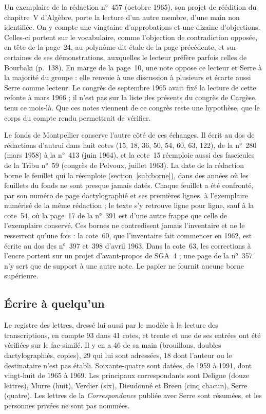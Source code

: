 \documentclass[11pt]{amsart}
\begin{document}
Un exemplaire de la rédaction n°~457 (octobre 1965), son projet de réédition du chapitre~V d'Algèbre, porte la lecture d'un autre membre, d'une main non identifiée. On y compte une vingtaine d'approbations et une dizaine d'objections. Celles-ci portent sur le vocabulaire, comme l'objection de contradiction opposée, en tête de la page~24, au polynôme dit étale de la page précédente, et sur certaines de ses démonstrations, auxquelles le lecteur préfère parfois celles de Bourbaki (p.~138). En marge de la page~10, une note oppose ce lecteur et Serre à la majorité du groupe : elle renvoie à une discussion à plusieurs et écarte aussi Serre comme lecteur. Le congrès de septembre 1965 avait fixé la lecture de cette refonte à mars 1966 ; il n'est pas sur la liste des présents du congrès de Cargèse, tenu ce mois-là. Que ces notes viennent de ce congrès reste une hypothèse, que le corps du compte rendu permettrait de vérifier.

Le fonds de Montpellier conserve l'autre côté de ces échanges. Il écrit au dos de rédactions d'autrui dans huit cotes (15, 18, 36, 50, 54, 60, 63, 122), de la n°~280 (mars 1958) à la n°~413 (juin 1964), et la cote~15 réemploie aussi des fascicules de la Tribu n°~59 (congrès de Pelvoux, juillet 1963). La date de la rédaction borne le feuillet qui la réemploie (section~\ref{sub:borne}), dans des années où les feuillets du fonds ne sont presque jamais datés. Chaque feuillet a été confronté, par son numéro de page dactylographié et ses premières lignes, à l'exemplaire numérisé de la même rédaction ; le texte s'y retrouve ligne pour ligne, sauf à la cote~54, où la page~17 de la n°~391 est d'une autre frappe que celle de l'exemplaire conservé. Ces bornes ne contredisent jamais l'inventaire et ne le resserrent qu'une fois : la cote~60, que l'inventaire fait commencer en 1962, est écrite au dos des n°~397 et~398 d'avril 1963. Dans la cote~63, les corrections à l'encre portent sur un projet d'avant-propos de SGA~4 ; une page de la n°~357 n'y sert que de support à une autre note. Le papier ne fournit aucune borne supérieure.

\subsection{Écrire à quelqu'un}

Le registre des lettres, dressé lui aussi par le modèle à la lecture des transcriptions, en compte 93 dans 41 cotes, et trente et une de ses entrées ont été vérifiées sur le fac-similé. Il y en a 46 de sa main (brouillons, doubles dactylographiés, copies), 29 qui lui sont adressées, 18 dont l'auteur ou le destinataire n'est pas établi. Soixante-quatre sont datées, de 1959 à 1991, dont vingt-huit de 1965 à 1969. Les principaux correspondants sont Deligne (douze lettres), Murre (huit), Verdier (six), Dieudonné et Breen (cinq chacun), Serre (quatre). Les lettres de la \emph{Correspondance} publiée avec Serre sont résumées, et les personnes privées ne sont pas nommées.
\end{document}
